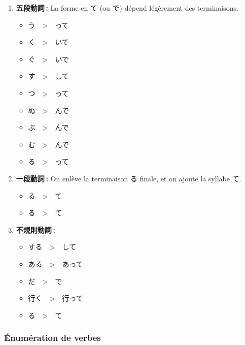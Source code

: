 \begin{enumerate}
    \item \textbf{五段動詞 :} La forme en て (ou で) dépend légèrement des terminaisons.
        \begin{itemize}
            \item {}う　>　って
            \item {}く　>　いて
            \item {}ぐ　>　いで
            \item {}す　>　して
            \item {}つ　>　って
            \item {}ぬ　>　んで
            \item {}ぶ　>　んで
            \item {}む　>　んで
            \item {}る　>　って
        \end{itemize}

    \item \textbf{一段動詞 :} On enlève la terminaison る finale, et on ajoute la syllabe て.
          \begin{itemize}
              \item {}る　>　て
              \item {}る　>　て
          \end{itemize}
    \item \textbf{不規則動詞 :}
          \begin{itemize}
              \item する　>　して
              \item ある　>　あって
              \item だ　>　で
              \item 行く　>　行って
              \item {}る　>　て
          \end{itemize}
\end{enumerate}

\subsubsection{Énumération de verbes}

